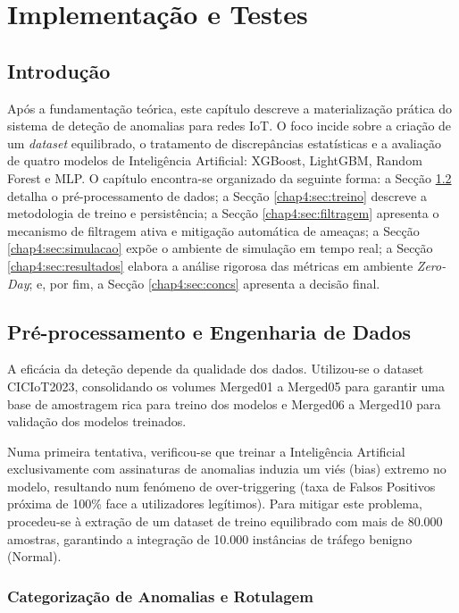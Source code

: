 \chapter{Implementação e Testes}
\label{chap:imp-test}

\section{Introdução}
\label{chap4:sec:intro}
Após a fundamentação teórica, este capítulo descreve a materialização prática do sistema de deteção de anomalias para redes \ac{IoT}. O foco incide sobre a criação de um \textit{dataset} equilibrado, o tratamento de discrepâncias estatísticas e a avaliação de quatro modelos de Inteligência Artificial: \ac{XGBoost}, \ac{LightGBM}, Random Forest e \ac{MLP}. O capítulo encontra-se organizado da seguinte forma: a Secção \ref{chap4:sec:preproc} detalha o pré-processamento de dados; a Secção \ref{chap4:sec:treino} descreve a metodologia de treino e persistência; a Secção \ref{chap4:sec:filtragem} apresenta o mecanismo de filtragem ativa e mitigação automática de ameaças; a Secção \ref{chap4:sec:simulacao} expõe o ambiente de simulação em tempo real; a Secção \ref{chap4:sec:resultados} elabora a análise rigorosa das métricas em ambiente \textit{Zero-Day}; e, por fim, a Secção \ref{chap4:sec:concs} apresenta a decisão final.

\section{Pré-processamento e Engenharia de Dados}
\label{chap4:sec:preproc}
A eficácia da deteção depende da qualidade dos dados. Utilizou-se o dataset CICIoT2023, consolidando os volumes Merged01 a Merged05 para garantir uma base de amostragem rica para treino dos modelos e Merged06 a Merged10 para validação dos modelos treinados.

Numa primeira tentativa, verificou-se que treinar a Inteligência Artificial exclusivamente com assinaturas de anomalias induzia um viés (bias) extremo no modelo, resultando num fenómeno de over-triggering (taxa de Falsos Positivos próxima de 100\% face a utilizadores legítimos). Para mitigar este problema, procedeu-se à extração de um dataset de treino equilibrado com mais de 80.000 amostras, garantindo a integração de 10.000 instâncias de tráfego benigno (Normal).

\subsection{Categorização de Anomalias e Rotulagem}

